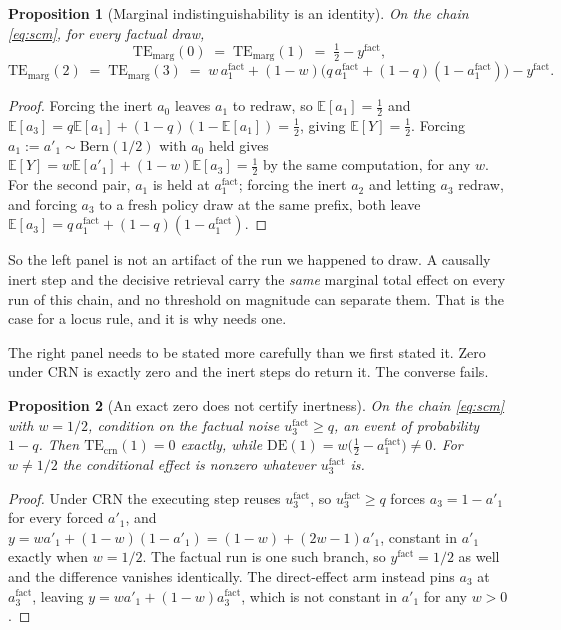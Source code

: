 \documentclass[11pt]{article}
\newtheorem{proposition}{Proposition}
\theoremstyle{remark}
\newcommand{\TEmarg}{\mathrm{TE}_{\mathrm{marg}}}
\newcommand{\TEcrn}{\mathrm{TE}_{\mathrm{crn}}}
\newcommand{\DE}{\mathrm{DE}}
\newcommand{\Ex}{\mathbb{E}}
\begin{document}
\begin{proposition}[Marginal indistinguishability is an identity]
\label{prop:marg-identity}
On the chain \eqref{eq:scm}, for every factual draw,
\[
  \TEmarg(0) \;=\; \TEmarg(1) \;=\; \tfrac{1}{2} - y^{\mathrm{fact}},
\]
\[
  \TEmarg(2) \;=\; \TEmarg(3) \;=\;
    w\,a^{\mathrm{fact}}_1 + (1-w)\bigl(q\,a^{\mathrm{fact}}_1
    + (1-q)(1-a^{\mathrm{fact}}_1)\bigr) - y^{\mathrm{fact}} .
\]
\end{proposition}

\begin{proof}
Forcing the inert $a_0$ leaves $a_1$ to redraw, so $\Ex[a_1] = \tfrac{1}{2}$ and
$\Ex[a_3] = q\Ex[a_1] + (1-q)(1-\Ex[a_1]) = \tfrac{1}{2}$, giving
$\Ex[Y] = \tfrac{1}{2}$. Forcing $a_1 := a'_1 \sim \mathrm{Bern}(1/2)$ with $a_0$
held gives $\Ex[Y] = w\Ex[a'_1] + (1-w)\Ex[a_3] = \tfrac{1}{2}$ by the same
computation, for any $w$. For the second pair, $a_1$ is held at
$a^{\mathrm{fact}}_1$; forcing the inert $a_2$ and letting $a_3$ redraw, and
forcing $a_3$ to a fresh policy draw at the same prefix, both leave
$\Ex[a_3] = q\,a^{\mathrm{fact}}_1 + (1-q)(1-a^{\mathrm{fact}}_1)$.
\end{proof}

So the left panel is not an artifact of the run we happened to draw. A causally
inert step and the decisive retrieval carry the \emph{same} marginal total effect
on every run of this chain, and no threshold on magnitude can separate them.
That is the case for a locus rule, and it is why \citet{car2026} needs one.

The right panel needs to be stated more carefully than we first stated it. Zero
under CRN is exactly zero and the inert steps do return it. The converse fails.

\begin{proposition}[An exact zero does not certify inertness]
\label{prop:crn-degeneracy}
On the chain \eqref{eq:scm} with $w = 1/2$, condition on the factual noise
$u_3^{\mathrm{fact}} \ge q$, an event of probability $1-q$. Then
$\TEcrn(1) = 0$ exactly, while
$\DE(1) = w\bigl(\tfrac{1}{2} - a^{\mathrm{fact}}_1\bigr) \ne 0$. For
$w \ne 1/2$ the conditional effect is nonzero whatever $u_3^{\mathrm{fact}}$ is.
\end{proposition}

\begin{proof}
Under CRN the executing step reuses $u_3^{\mathrm{fact}}$, so
$u_3^{\mathrm{fact}} \ge q$ forces $a_3 = 1 - a'_1$ for every forced $a'_1$, and
$y = w a'_1 + (1-w)(1-a'_1) = (1-w) + (2w-1)a'_1$, constant in $a'_1$ exactly
when $w = 1/2$. The factual run is one such branch, so $y^{\mathrm{fact}} = 1/2$
as well and the difference vanishes identically. The direct-effect arm instead
pins $a_3$ at $a^{\mathrm{fact}}_3$, leaving $y = w a'_1 + (1-w)a^{\mathrm{fact}}_3$,
which is not constant in $a'_1$ for any $w > 0$.
\end{proof}
\end{document}
